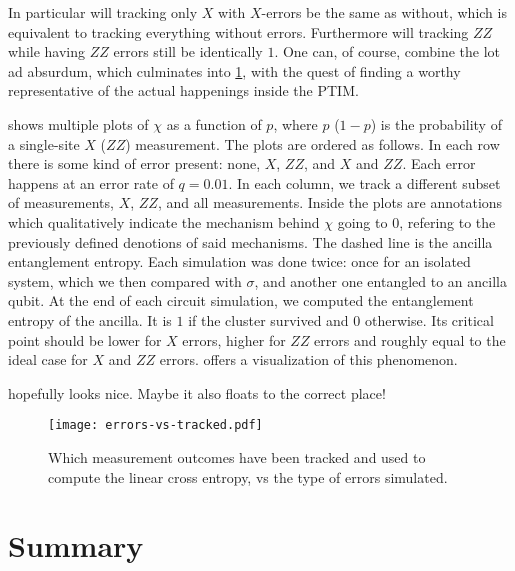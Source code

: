 In particular will tracking only $X$ with $X$-errors be the same as without, which
is equivalent to tracking everything without errors. Furthermore will tracking
$ZZ$ while having $ZZ$ errors still be identically $1$. One can, of course,
combine the lot ad absurdum, which culminates into \cref{fig:err-vs-tra}, with
the quest of finding a worthy representative of the actual happenings inside
the PTIM.

 shows multiple plots of $\chi$ as a function of
$p$, where $p$ ($1-p$) is the probability of a single-site $X$ ($ZZ$)
measurement. The plots are ordered as follows. In each row there is some kind of
error present: none, $X$, $ZZ$, and $X$ and $ZZ$. Each error happens at an
error rate of $q=0.01$. In each column, we track a different subset of
measurements, $X$, $ZZ$, and all measurements.
Inside the plots are annotations which qualitatively
indicate the mechanism behind $\chi$ going to $0$, refering to the previously
defined denotions of said mechanisms. The dashed line is the ancilla
entanglement entropy. Each simulation was done twice: once for an isolated
system, which we then compared with $\sigma$, and another one entangled to an
ancilla qubit. At the end of each circuit simulation, we computed the
entanglement entropy of the ancilla. It is $1$ if the cluster survived and $0$
otherwise. Its critical point should be lower for $X$ errors, higher for $ZZ$
errors and roughly equal to the ideal case for $X$ and $ZZ$ errors.
 offers a visualization of this phenomenon.

 hopefully looks nice. Maybe it also floats to the correct
place!
\begin{figure}[H]
  \centering
  \texttt{[image: errors-vs-tracked.pdf]}
  \caption{Which measurement outcomes have been tracked and used to compute the
  linear cross entropy, vs the type of errors simulated.}
  \label{fig:err-vs-tra}
\end{figure}
\section{Summary}
